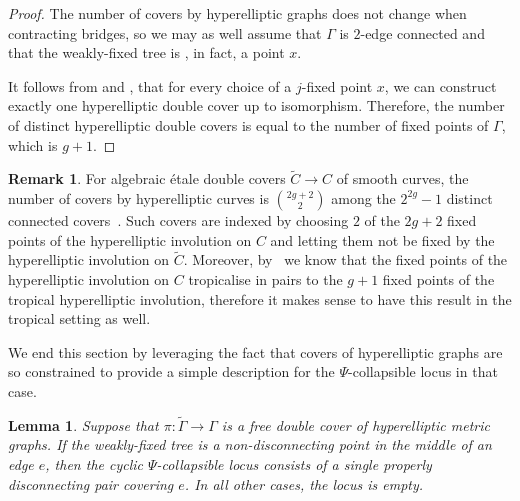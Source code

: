 \documentclass[11pt]{article}
\newtheorem{lemma}[theo]{Lemma}
\theoremstyle{definition}
\newtheorem{rema}[theo]{Remark}
\numberwithin{equation}{section}
\theoremstyle{definition}
\newcommand{\Ga}{\Gamma}
\newcommand{\wt}[1]{\widetilde{#1}}
\begin{document}
\begin{proof}
       The number of covers by hyperelliptic graphs does not change when contracting bridges, so we may as well assume that $\Gamma$ is
     $2$-edge connected and that the weakly-fixed tree is , in fact, a point $x$. 

       It follows from  and , that for every choice of a $j$-fixed point $x$, we can construct exactly one hyperelliptic double cover up to isomorphism. Therefore,
        the number of distinct hyperelliptic double covers is equal to the number of fixed points of $\Ga$, which is $g+1$.
\end{proof}

\begin{rema}
    For algebraic \'etale double covers $\widetilde C\to C$ of smooth curves, the number of covers by hyperelliptic curves is $\binom{2g+2}{2}$ among the $2^{2g}-1$ distinct connected covers~\cite{HMfarkashypcovers}. 
   Such covers are indexed by choosing $2$  of the $2g+2$ fixed points of the hyperelliptic involution on $C$ and letting them not be fixed by the hyperelliptic involution on $\wt C$. 
     Moreover, by~\cite{Panizzut} we know that the  fixed points of the hyperelliptic involution on $C$ tropicalise in pairs to the $g+1$ fixed points of the tropical hyperelliptic involution, therefore it makes sense to have this result in the tropical setting as well.
  
\end{rema}

We end this section by leveraging the fact that covers of hyperelliptic graphs are so constrained    to provide a simple description for  the $\Psi$-collapsible locus in that case. 

\begin{lemma}\label{lem:CollapsibleLocusOfHyperelliptic}
    Suppose that $\pi:\wt\Gamma\to\Gamma$ is a free double cover of hyperelliptic metric graphs. If the weakly-fixed tree is a non-disconnecting point in the middle of an edge $e$, then the cyclic $\Psi$-collapsible locus consists of a single properly disconnecting pair covering $e$. In all other cases, the locus is empty. 
\end{lemma}
\end{document}
